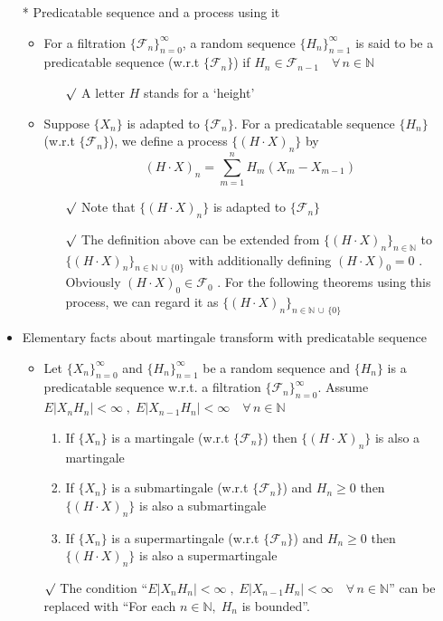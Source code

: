 \documentclass[12pt, A4]{article}
\newcommand{\rmk}{$\surd$}
\newcommand{\N}{\mathbb{N}}
\newcommand{\F}{\mathcal{F}}
\newcommand{\union}{\,\cup\,}
\newcommand{\foranyn}{\quad \forall \, n\in \N}
\begin{document}
\begin{itemize}
	\item[*] Predicatable sequence and a process using it
	\begin{itemize}
		\item For a filtration $\{\F_n\}_{n=0}^\infty$, a random sequence $\{H_n\}_{n=1}^\infty$ is said to be a predicatable sequence (w.r.t $\{\F_n\}$) if $H_n\in \F_{n-1}\foranyn$
		\begin{itemize}
			\item[\rmk] A letter $H$ stands for a `height'
		\end{itemize}
		\item Suppose $\{X_n\}$ is adapted to $\{\F_n\}$. For a predicatable sequence $\{H_n\}$ (w.r.t $\{\F_n\}$), we define a process $\{(H\cdot X)_n\}$ by $$(H\cdot X)_n=\sum_{m=1}^n H_m(X_m-X_{m-1}) $$
		\begin{itemize}
			\item[\rmk] Note that $\{(H\cdot X)_n\}$ is adapted to $\{\F_n\}$
			\item[\rmk] The definition above can be extended from $\{(H\cdot X)_n\}_{n\in \N}$ to $\{(H\cdot X)_n\}_{n\in \N\union \{0\}}$ with additionally defining $(H\cdot X)_0=0$ . Obviously $(H\cdot X)_0\in \F_0$ . For the following theorems using this process, we can regard it as $\{(H\cdot X)_n\}_{n\in \N\union \{0\}}$
		\end{itemize}
	\end{itemize}
	\item Elementary facts about martingale transform with predicatable sequence 
	\begin{itemize}
		\item Let $\{X_n\}_{n=0}^\infty$ and $\{H_n\}_{n=1}^\infty$ be a random sequence and $\{H_n\}$ is a predicatable sequence w.r.t. a filtration $\{\F_n\}_{n=0}^\infty$. Assume $E|X_nH_n|<\infty\;,\; E|X_{n-1}H_n|<\infty\foranyn$
		\begin{enumerate}
			\item If $\{X_n\}$ is a martingale (w.r.t $\{\F_n\}$) then $\{(H\cdot X)_n\}$ is also a martingale
			\item If $\{X_n\}$ is a submartingale (w.r.t $\{\F_n\}$) and $H_n\geq 0$ then $\{(H\cdot X)_n\}$ is also a submartingale
			\item If $\{X_n\}$ is a supermartingale (w.r.t $\{\F_n\}$) and $H_n\geq 0$ then $\{(H\cdot X)_n\}$ is also a supermartingale
		\end{enumerate}
		\item[\rmk] The condition ``$E|X_nH_n|<\infty\;,\; E|X_{n-1}H_n|<\infty\foranyn$'' can be replaced with ``For each $n\in \N, \;H_n$ is bounded''.

\end{itemize}
\end{itemize}
\end{document}
